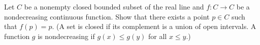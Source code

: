 Let \( C\) be a nonempty closed bounded subset of the real line and \( f\colon  C\to C\) be a nondecreasing continuous function. Show that there exists a point \( p\in C\) such that \( f(p) = p\).
(A set is closed if its complement is a union of open intervals. A function \( g\) is nondecreasing if \( g(x)\le g(y)\) for all \( x\le y\).)